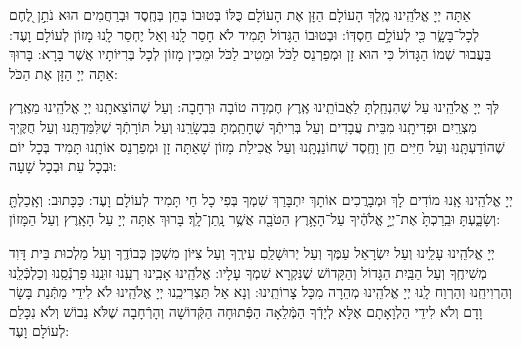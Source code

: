 \documentclass[twoside, openany, parskip=half, 11pt]{book}
\begin{document}
	 אַתָּה יְיָ אֱלֹהֵֽינוּ מֶֽלֶךְ הָעוֹלָם הַזָּן אֶת הָעוֹלָם כֻּלּוֹ בְּטוּבוֹ בְּחֵן בְּחֶֽסֶד וּבְרַחֲמִים הוּא נֹתֵ֣ן
	  לֶ֭חֶם לְכָל־בָּשָׂ֑ר כִּ֖י לְעוֹלָ֣ם חַסְדּֽוֹ: וּבְטוּבוֹ הַגָּדוֹל תָּמִיד לֹא חָסַר לָֽנוּ וְאַל יֶחְסַר לָֽנוּ מָזוֹן לְעוֹלָם וָעֶד: בַּעֲבוּר שְׁמוֹ הַגָּדוֹל כִּי הוּא זָן וּמְפַרְנֵס לַכֹּל וּמֵטִיב לַכֹּל וּמֵכִין מָזוֹן לְכָל בְּרִיּוֹתָיו אֲשֶׁר בָּרָא: בָּרוּךְ אַתָּה יְיָ הַזָּן אֶת הַכֹּל:
	

	
	 לְּךָ יְיָ אֱלֹהֵֽינוּ עַל שֶׁהִנְחַֽלְתָּ לַאֲבוֹתֵֽינוּ אֶֽרֶץ חֶמְדָה טוֹבָה וּרְחָבָה: וְעַל שֶׁהוֹצֵאתָֽנוּ יְיָ אֱלֹהֵֽינוּ מֵאֶֽרֶץ מִצְרַֽיִם וּפְדִיתָֽנוּ מִבֵּית עֲבָדִים וְעַל בְּרִיתְֿךָ שֶׁחָתַֽמְתָּ בִּבְשָׂרֵֽנוּ וְעַל תּוֹרָתְֿךָ שֶׁלִּמַּדְתָּֽנוּ וְעַל חֻקֶּֽיךָ שֶׁהוֹדַעְתָּֽנוּ וְעַל חַיִּים חֵן וָחֶֽסֶד שֶׁחוֹנַנְתָּֽנוּ וְעַל אֲכִילַת מָזוֹן שָׁאַתָּה זָן וּמְפַרְנֵס אוֹתָֽנוּ תָּמִיד בְּכָל יוֹם וּבְכָל עֵת וּבְכָל שָׁעָה:


\alhanisim

 יְיָ אֱלֹהֵֽינוּ אָֽנוּ מוֹדִים לָךְ וּמְבָרֲכִים אוֹתָךְ יִתְבָּרַךְ שִׁמְךָ בְּפִי כָל חַי תָּמִיד לְעוֹלָם וָעֶד: כַּכָּתוּב:
  וְאָֽכַלְתָּ֖ וְשָׂבָ֑עְתָּ וּבֵֽרַכְתָּ֙ אֶת־יְיָ֣ אֱלֹהֶ֔יךָ עַל־הָאָ֥רֶץ הַטֹּבָ֖ה אֲשֶׁ֥ר נָֽתַן־לָֽךְ׃ בָּרוּךְ אַתָּה יְיָ עַל הָאָֽרֶץ וְעַל הַמָּזוֹן:

 

 יְיָ אֱלֹהֵֽינוּ עָלֵֽינוּ וְעַל יִשְׂרָאֵל עַמֶּךָ וְעַל יְרוּשָׁלַֽםִ עִירֶֽךָ וְעַל צִיּוֹן מִשְׁכַּן כְּבוֹדֶֽךָ וְעַל מַלְכוּת בֵּית דָּוִד מְשִׁיחֶֽךָ וְעַל הַבַּֽיִת הַגָּדוֹל וְהַקָּדוֹשׁ שֶׁנִּקְרָא שִׁמְךָ עָלָיו: אֱלֹהֵֽינוּ אָבִֽינוּ רְעֵֽנוּ זוּנֵֽנוּ פַרְנְֿסֵֽנוּ וְכַלְכְּֿלֵֽנוּ וְהַרְוִיחֵֽנוּ וְהַרְוַח לָֽנוּ יְיָ אֱלֹהֵֽינוּ מְהֵרָה מִכָּל צָרוֹתֵֽינוּ: וְנָא אַל תַּצְרִיכֵֽנוּ יְיָ אֱלֹהֵֽינוּ לֹא לִידֵי מַתְּֿנַת בָּשָׂר וָדָם וְלֹא לִידֵי הַלְוָאָתָם אֶלָּא לְיָדְֿךָ הַמְּֿלֵאָה הַפְּֿתוּחָה הַקְּֿדוֹשָׁה וְהָרְֿחָבָה שֶׁלֹּא נֵבוֹשׁ וְלֹא נִכָּלֵם לְעוֹלָם וָעֶד:
\end{document}
